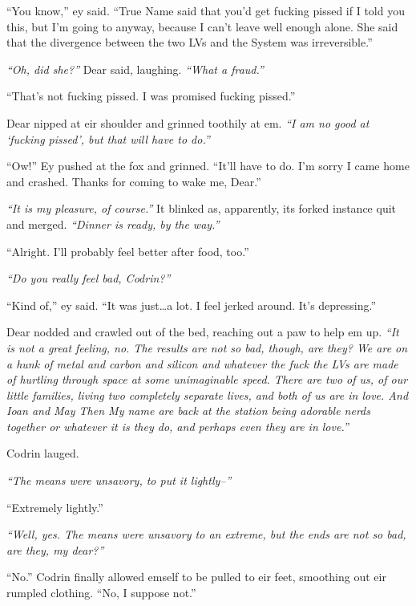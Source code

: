 ``You know,'' ey said. ``True Name said that you'd get fucking pissed if I told you this, but I'm going to anyway, because I can't leave well enough alone. She said that the divergence between the two LVs and the System was irreversible.''

\emph{``Oh, did she?''} Dear said, laughing. \emph{``What a fraud.''}

``That's not fucking pissed. I was promised fucking pissed.''

Dear nipped at eir shoulder and grinned toothily at em. \emph{``I am no good at `fucking pissed', but that will have to do.''}

``Ow!'' Ey pushed at the fox and grinned. ``It'll have to do. I'm sorry I came home and crashed. Thanks for coming to wake me, Dear.''

\emph{``It is my pleasure, of course.''} It blinked as, apparently, its forked instance quit and merged. \emph{``Dinner is ready, by the way.''}

``Alright. I'll probably feel better after food, too.''

\emph{``Do you really feel bad, Codrin?''}

``Kind of,'' ey said. ``It was just\ldots a lot. I feel jerked around. It's depressing.''

Dear nodded and crawled out of the bed, reaching out a paw to help em up. \emph{``It is not a great feeling, no. The results are not so bad, though, are they? We are on a hunk of metal and carbon and silicon and whatever the fuck the LVs are made of hurtling through space at some unimaginable speed. There are two of us, of our little families, living two completely separate lives, and both of us are in love. And Ioan and May Then My name are back at the station being adorable nerds together or whatever it is they do, and perhaps even they are in love.''}

Codrin lauged.

\emph{``The means were unsavory, to put it lightly--''}

``Extremely lightly.''

\emph{``Well, yes. The means were unsavory to an extreme, but the ends are not so bad, are they, my dear?''}

``No.'' Codrin finally allowed emself to be pulled to eir feet, smoothing out eir rumpled clothing. ``No, I suppose not.''

